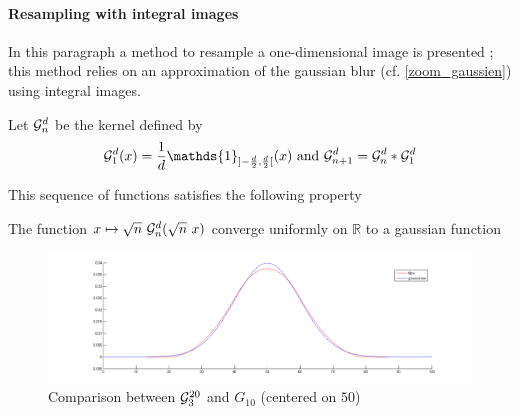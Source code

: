 


\paragraph{Resampling with integral images}
\label{4Integral}

In this paragraph a method to resample a one-dimensional image is presented ; this method relies on an approximation of the gaussian blur (cf. \ref{zoom_gaussien}) using integral images.


Let $\mathcal{G}_n^d$ be the kernel defined by
\begin{equation*}
\Gcal_1^d(x)=\frac{1}{d}\mathds{1}_{]-\frac{d}{2},\frac{d}{2}[}(x) \text{ and } \Gcal_{n+1}^d= \Gcal_n^d * \Gcal_1^d 
\label{formule_convol_n_int}
\end{equation*}

This sequence of functions satisfies the following property
\begin{prop}
The function $x\mapsto \sqrt{n}~\mathcal{G}_n^d(\sqrt{n}~x)$ converge uniformly on $\mathbb{R}$ to a gaussian function 
\end{prop}


\begin{figure}
\centering
\includegraphics[width=15cm]{filtre_g3.png}
\caption{Comparison between $\mathcal{G}_3^{20}$ and $G_{10}$ (centered on $50$)}
\end{figure}

